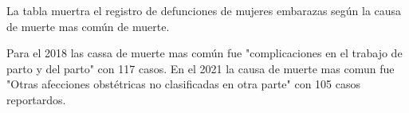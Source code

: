 La tabla muertra el registro de defunciones de mujeres embarazas según la causa de muerte mas común de muerte. 

Para el 2018 las cassa de muerte mas común fue "complicaciones en el trabajo de parto y del parto" con 117 casos. En el 2021 la causa de muerte mas comun fue "Otras afecciones obstétricas no clasificadas en otra parte" con 105 casos reportardos. 